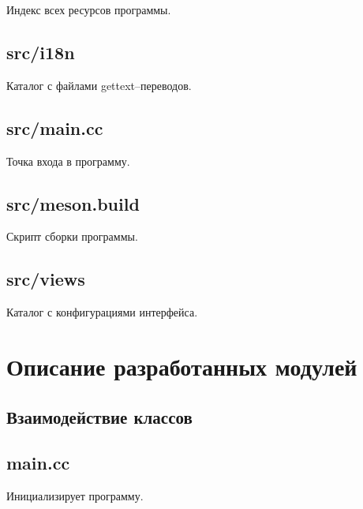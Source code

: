 Индекс всех ресурсов программы.

\subsection{src/i18n}

Каталог с файлами gettext--переводов.

\subsection{src/main.cc}

Точка входа в программу.

\subsection{src/meson.build}

Скрипт сборки программы.

\subsection{src/views}

Каталог с конфигурациями интерфейса.

\section{Описание разработанных модулей}

\subsection{Взаимодействие классов}


\subsection{main.cc}

Инициализирует программу.
